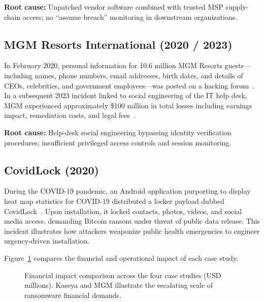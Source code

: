 \documentclass[sigconf,nonacm]{acmart}
\begin{document}
\textbf{Root cause:} Unpatched vendor software combined with trusted MSP supply-chain
access; no ``assume breach'' monitoring in downstream organizations.

\subsection{MGM Resorts International (2020 / 2023)}

In February 2020, personal information for 10.6 million MGM Resorts guests---including
names, phone numbers, email addresses, birth dates, and details of CEOs, celebrities,
and government employees---was posted on a hacking forum~\cite{moatsum2022}. In a
subsequent 2023 incident linked to social engineering of the IT help desk, MGM
experienced approximately \$100 million in total losses including earnings impact,
remediation costs, and legal fees~\cite{toulas2023}.

\textbf{Root cause:} Help-desk social engineering bypassing identity verification
procedures; insufficient privileged access controls and session monitoring.

\subsection{CovidLock (2020)}

During the COVID-19 pandemic, an Android application purporting to display heat map
statistics for COVID-19 distributed a locker payload dubbed
CovidLock~\cite{saeed2020}. Upon installation, it locked contacts, photos, videos, and
social media access, demanding Bitcoin ransom under threat of public data release.
This incident illustrates how attackers weaponize public health emergencies to engineer
urgency-driven installation.

Figure~\ref{fig:impacts} compares the financial and operational impact of each case
study.

\begin{figure}[h]
\centering
{}%
\caption{Financial impact comparison across the four case studies (USD millions).
  Kaseya and MGM illustrate the escalating scale of ransomware financial demands.}
\label{fig:impacts}
\end{figure}
\end{document}
